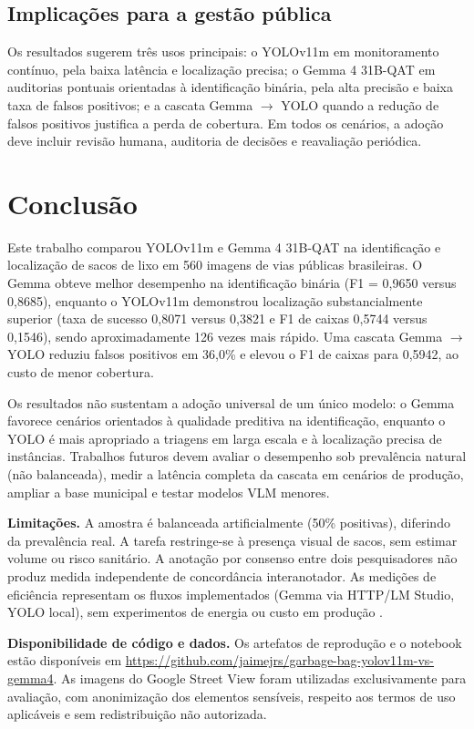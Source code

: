 \documentclass[kdmile,a4paper]{kdmile}
\begin{document}
\subsection{Implicações para a gestão pública}
\label{sec:implicacoes-gestao}

Os resultados sugerem três usos principais: o YOLOv11m em monitoramento contínuo, pela baixa latência e localização precisa; o Gemma 4 31B-QAT em auditorias pontuais orientadas à identificação binária, pela alta precisão e baixa taxa de falsos positivos; e a cascata Gemma $\to$ YOLO quando a redução de falsos positivos justifica a perda de cobertura. Em todos os cenários, a adoção deve incluir revisão humana, auditoria de decisões e reavaliação periódica.

\section{Conclusão}
\label{sec:conclusao}

Este trabalho comparou YOLOv11m e Gemma 4 31B-QAT na identificação e localização de sacos de lixo em 560 imagens de vias públicas brasileiras. O Gemma obteve melhor desempenho na identificação binária (F1 = 0,9650 versus 0,8685), enquanto o YOLOv11m demonstrou localização substancialmente superior (taxa de sucesso 0,8071 versus 0,3821 e F1 de caixas 0,5744 versus 0,1546), sendo aproximadamente 126 vezes mais rápido. Uma cascata Gemma $\to$ YOLO reduziu falsos positivos em 36,0\% e elevou o F1 de caixas para 0,5942, ao custo de menor cobertura.

Os resultados não sustentam a adoção universal de um único modelo: o Gemma favorece cenários orientados à qualidade preditiva na identificação, enquanto o YOLO é mais apropriado a triagens em larga escala e à localização precisa de instâncias. Trabalhos futuros devem avaliar o desempenho sob prevalência natural (não balanceada), medir a latência completa da cascata em cenários de produção, ampliar a base municipal e testar modelos VLM menores.

\noindent\textbf{Limitações.} A amostra é balanceada artificialmente (50\% positivas), diferindo da prevalência real. A tarefa restringe-se à presença visual de sacos, sem estimar volume ou risco sanitário. A anotação por consenso entre dois pesquisadores não produz medida independente de concordância interanotador. As medições de eficiência representam os fluxos implementados (Gemma via HTTP/LM Studio, YOLO local), sem experimentos de energia ou custo em produção \cite{Madan2024FewShotVLM}.

\noindent\textbf{Disponibilidade de código e dados.} Os artefatos de reprodução e o notebook estão disponíveis em \url{https://github.com/jaimejrs/garbage-bag-yolov11m-vs-gemma4}. As imagens do Google Street View foram utilizadas exclusivamente para avaliação, com anonimização dos elementos sensíveis, respeito aos termos de uso aplicáveis e sem redistribuição não autorizada.




\begin{received}
\end{received}
\end{document}
